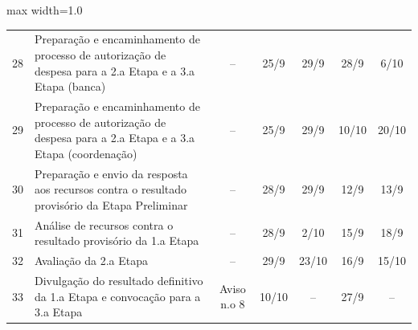 \begin{quadro}[htb]
\begin{adjustbox}{max width=1.0\linewidth}
\begin{tabular}{|c|l|c|c|c|c|c|}
28 & Preparação e   encaminhamento de processo de autorização de despesa para a 2.a Etapa e a 3.a   Etapa (banca)                               & –                   & 25/9                                                                            & 29/9                                  & 28/9                                                                            & 6/10                 \\
29 & Preparação e   encaminhamento de processo de autorização de despesa para a 2.a Etapa e a 3.a   Etapa (coordenação)                         & –                   & 25/9                                                                            & 29/9                                  & 10/10                                                                           & 20/10                \\
30 & Preparação e envio da   resposta aos recursos contra o resultado provisório da Etapa Preliminar                                            & –                   & 28/9                                                                            & 29/9                                  & 12/9                                                                            & 13/9                 \\
\rowcolor[HTML]{FCD5B4} 
31 & Análise de recursos   contra o resultado provisório da 1.a Etapa                                                                           & –                   & 28/9                                                                            & 2/10                                  & 15/9                                                                            & 18/9                 \\
\rowcolor[HTML]{FCD5B4} 
32 & Avaliação da 2.a   Etapa                                                                                                                   & –                   & 29/9                                                                            & 23/10                                 & 16/9                                                                            & 15/10                \\
\rowcolor[HTML]{92CDDC} 
33 & Divulgação do   resultado definitivo da 1.a Etapa e convocação para a 3.a Etapa                                                            & Aviso n.o 8         & 10/10                                                                           & –                                     & 27/9                                                                            & –                    \\

\end{tabular}
\end{adjustbox}
\end{quadro}
